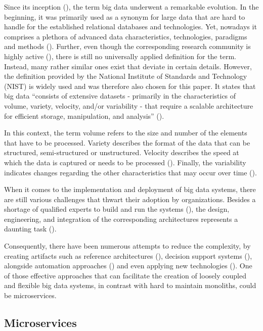 \documentclass[conference]{IEEEtran}
\begin{document}
Since its inception (\cite{Diebold.2012}), the term big data underwent a remarkable evolution. In the beginning, it was primarily used as a synonym for large data that are hard to handle for the established relational databases and technologies. Yet, nowadays it comprises a plethora of advanced data characteristics, technologies, paradigms and methods (\cite{Volk.2020b}). Further, even though the corresponding research community is highly active (\cite{Parlina.2020}), there is still no universally applied definition for the term. Instead, many rather similar ones exist that deviate in certain details. However, the definition provided by the National Institute of Standards and Technology (NIST) is widely used and was therefore also chosen for this paper. It states that big data “consists of extensive datasets - primarily in the characteristics of volume, variety, velocity, and/or variability - that require a scalable architecture for efficient storage, manipulation, and analysis” (\cite{Chang.2019}).

In this context, the term volume refers to the size and number of the elements that have to be processed. Variety describes the format of the data that can be structured, semi-structured or unstructured. Velocity describes the speed at which the data is captured or needs to be processed (\cite{Gandomi.2015}). Finally, the variability indicates changes regarding the other characteristics that may occur over time (\cite{Chang.2019}).

When it comes to the implementation and deployment of big data systems, there are still various challenges that thwart their adoption by organizations. Besides a shortage of qualified experts to build and run the systems (\cite{Gardiner.2018}), the design, engineering, and integration of the corresponding architectures represents a daunting task (\cite{Volk.2019}).

Consequently, there have been numerous attempts to reduce the complexity, by creating artifacts such as reference architectures (\cite{ataei2021neomycelia}), decision support systems (\cite{Volk.2020}), alongside automation approaches (\cite{Fernandez.2020}) and even applying new technologies (\cite{Freymann.2020}). One of those effective approaches that can facilitate the creation of loosely coupled and flexible big data systems, in contrast with hard to maintain monoliths, could be microservices. 

\subsection{Microservices}
\end{document}
